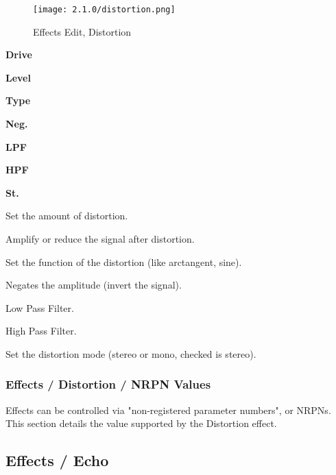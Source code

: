 \begin{figure}[H]
   \centering
   \texttt{[image: 2.1.0/distortion.png]}
   \caption{Effects Edit, Distortion}
   \label{fig:effects_edit_distortion}
\end{figure}

   \begin{enumber}
      \item \textbf{Drive}
      \item \textbf{Level}
      \item \textbf{Type}
      \item \textbf{Neg.}
      \item \textbf{LPF}
      \item \textbf{HPF}
      \item \textbf{St.}
   \end{enumber}

   \setcounter{ItemCounter}{0}      %

   Set the amount of distortion.

   Amplify or reduce the signal after distortion.

   Set the function of the distortion (like arctangent, sine).

   Negates the amplitude (invert the signal).

   Low Pass Filter.

   High Pass Filter.

   Set the distortion mode (stereo or mono, checked is stereo).

\subsubsection{Effects / Distortion / NRPN Values}
\label{subsubsec:effects_edit_distortion_nrpn}

   Effects can be controlled via "non-registered parameter numbers", or NRPNs.
   This section details the value supported by the Distortion effect.

\subsection{Effects / Echo}
\label{subsec:effects_edit_echo}

